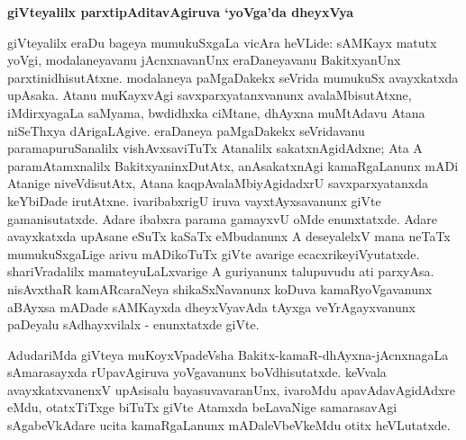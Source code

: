 \begin{center}
\textbf{\Large{giVteyalilx parxtipAditavAgiruva `yoVga'da dheyxVya}}
\end{center}

giVteyalilx eraDu bageya mumukuSxgaLa vicAra heVLide: sAMKayx matutx yoVgi, modalaneyavanu jAcnxnavanUnx eraDaneyavanu BakitxyanUnx parxtinidhisutAtxne. modalaneya paMgaDakekx seVrida mumukuSx avayxkatxda upAsaka. Atanu muKayxvAgi savxparxyatanxvanunx avalaMbisutAtxne, iMdirxyagaLa saMyama, bwdidhxka ciMtane, dhAyxna muMtAdavu Atana niSeThxya dArigaLAgive. eraDaneya paMgaDakekx seVridavanu paramapuruSanalilx vishAvxsaviTuTx Atanalilx sakatxnAgidAdxne; Ata A paramAtamxnalilx BakitxyaninxDutAtx, anAsakatxnAgi kamaRgaLanunx mADi Atanige niveVdisutAtx, Atana kaqpAvalaMbiyAgidadxrU savxparxyatanxda keYbiDade irutAtxne. ivaribabxrigU iruva vayxtAyxsavanunx giVte gamanisutatxde. Adare ibabxra parama gamayxvU oMde enunxtatxde. Adare avayxkatxda upAsane eSuTx kaSaTx eMbudanunx A deseyalelxV mana neTaTx mumukuSxgaLige arivu mADikoTuTx giVte avarige ecacxrikeyiVyutatxde. shariVradalilx mamateyuLaLxvarige A guriyanunx talupuvudu ati parxyAsa. nisAvxthaR kamARcaraNeya shikaSxNavanunx koDuva kamaRyoVgavanunx aBAyxsa mADade sAMKayxda dheyxVyavAda tAyxga veYrAgayxvanunx paDeyalu sAdhayxvilalx - enunxtatxde giVte.

AdudariMda giVteya muKoyxVpadeVsha Bakitx-kamaR-dhAyxna-jAcnxnagaLa sAmarasayxda rUpavAgiruva yoVgavanunx boVdhisutatxde. keVvala avayxkatxvanenxV upAsisalu bayasuvavaranUnx, ivaroMdu apavAdavAgidAdxre eMdu, otatxTiTxge biTuTx giVte Atamxda beLavaNige samarasavAgi sAgabeVkAdare ucita kamaRgaLanunx mADaleVbeVkeMdu otitx heVLutatxde.

